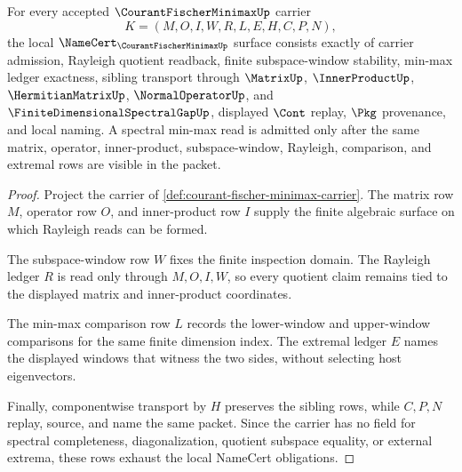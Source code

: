\begin{theorem}
\label{thm:courant-fischer-minimax-namecert-obligations}
For every accepted $\CourantFischerMinimaxUp$ carrier
$$
K=(M,O,I,W,R,L,E,H,C,P,N),
$$
the local $\NameCert_{\CourantFischerMinimaxUp}$ surface consists exactly of carrier admission, Rayleigh quotient readback, finite subspace-window stability, min-max ledger exactness, sibling transport through $\MatrixUp$, $\InnerProductUp$, $\HermitianMatrixUp$, $\NormalOperatorUp$, and $\FiniteDimensionalSpectralGapUp$, displayed $\Cont$ replay, $\Pkg$ provenance, and local naming. A spectral min-max read is admitted only after the same matrix, operator, inner-product, subspace-window, Rayleigh, comparison, and extremal rows are visible in the packet.
\end{theorem}
\begin{proof}
Project the carrier of \autoref{def:courant-fischer-minimax-carrier}. The matrix row $M$, operator row $O$, and inner-product row $I$ supply the finite algebraic surface on which Rayleigh reads can be formed.

The subspace-window row $W$ fixes the finite inspection domain. The Rayleigh ledger $R$ is read only through $M,O,I,W$, so every quotient claim remains tied to the displayed matrix and inner-product coordinates.

The min-max comparison row $L$ records the lower-window and upper-window comparisons for the same finite dimension index. The extremal ledger $E$ names the displayed windows that witness the two sides, without selecting host eigenvectors.

Finally, componentwise transport by $H$ preserves the sibling rows, while $C,P,N$ replay, source, and name the same packet. Since the carrier has no field for spectral completeness, diagonalization, quotient subspace equality, or external extrema, these rows exhaust the local NameCert obligations.
\end{proof}


